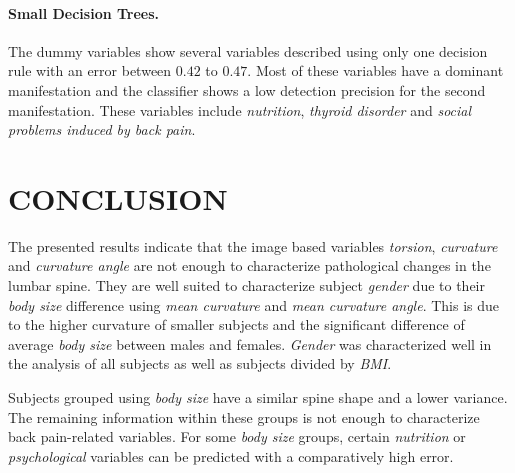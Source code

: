 \documentclass[a4paper,twoside]{style/article}
\newcommand{\com}[1]{\textcolor{orange}{\uline{#1}}}
\begin{document}
\paragraph{Small Decision Trees. }
The dummy variables show several variables described using only one decision rule with an error between $0.42$ to $0.47$.
Most of these variables have a dominant manifestation and the classifier shows a low detection precision for the second manifestation.
These variables include \emph{nutrition}, \emph{thyroid disorder} and \emph{social problems induced by back pain}.




\section{\uppercase{Conclusion}}
\label{sec:Conclusion}
\noindent The presented results indicate that the image based variables \emph{torsion}, \emph{curvature} and \emph{curvature angle} are not enough to characterize pathological changes in the lumbar spine.
They are well suited to characterize subject \emph{gender} due to their \emph{body size} difference using \emph{mean curvature} and \emph{mean curvature angle}.
This is due to the higher curvature of smaller subjects and the significant difference of average \emph{body size} between males and females.
\emph{Gender} was characterized well in the analysis of all subjects as well as subjects divided by \emph{BMI}.

Subjects grouped using \emph{body size} have a similar spine shape and a lower variance.
The remaining information within these groups is not enough to characterize back pain-related variables.
For some \emph{body size} groups, certain \emph{nutrition} or \emph{psychological} variables can be predicted with a comparatively high error.
\end{document}
